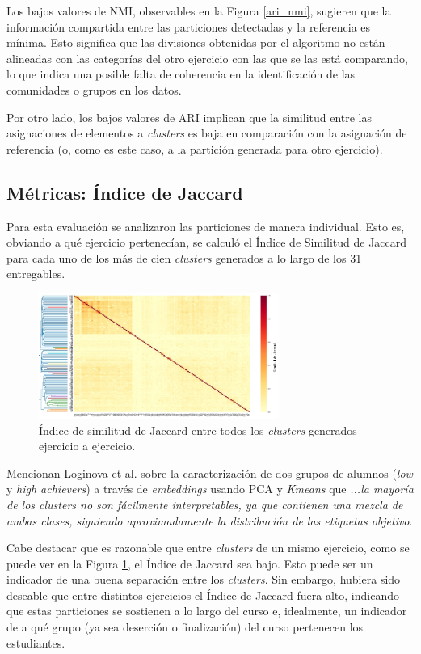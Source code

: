 \documentclass[11pt,a4paper,twoside,openany]{tesis}
\begin{document}
Los bajos valores de NMI, observables en la Figura \ref{ari_nmi}, sugieren que la información compartida entre las particiones detectadas y la referencia es mínima. Esto significa que las divisiones obtenidas por el algoritmo no están alineadas con las categorías del otro ejercicio con las que se las está comparando, lo que indica una posible falta de coherencia en la identificación de las comunidades o grupos en los datos.

Por otro lado, los bajos valores de ARI implican que la similitud entre las asignaciones de elementos a \emph{clusters} es baja en comparación con la asignación de referencia (o, como es este caso, a la partición generada para otro ejercicio).

\subsection{Métricas: Índice de Jaccard}
Para esta evaluación se analizaron las particiones de manera individual. Esto es, obviando a qué ejercicio pertenecían, se calculó el Índice de Similitud de Jaccard \cite{jaccard} para cada uno de los más de cien \emph{clusters} generados a lo largo de los 31 entregables.

\begin{figure}
    \centering
    \includegraphics[width=0.7\textwidth]{imagenes/clusterxcluster.png}
    \caption{Índice de similitud de Jaccard entre todos los \emph{clusters} generados ejercicio a ejercicio.}
     \label{jaccard}
\end{figure}


Mencionan Loginova et al. sobre la caracterización de dos grupos de alumnos (\emph{low} y \emph{high achievers}) a través de \emph{embeddings} usando PCA y \emph{Kmeans} que \emph{...la mayoría de los clusters no son fácilmente interpretables, ya que contienen una mezcla de ambas clases, siguiendo aproximadamente la distribución de las etiquetas objetivo}\cite{loginova2021embedding}.


Cabe destacar que es razonable que entre \emph{clusters} de un mismo ejercicio, como se puede ver en la Figura \ref{jaccard}, el Índice de Jaccard sea bajo. Esto puede ser un indicador de una buena separación entre los \emph{clusters}. Sin embargo, hubiera sido deseable que entre distintos ejercicios el Índice de Jaccard fuera alto, indicando que estas particiones se sostienen a lo largo del curso e, idealmente, un indicador de a qué grupo (ya sea deserción o finalización) del curso pertenecen los estudiantes. 
\end{document}
